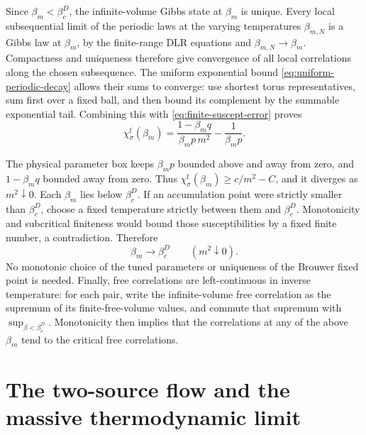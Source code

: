 \documentclass[11pt]{article}
\begin{document}
Since \(\beta_m<\beta_c^D\), the infinite-volume Gibbs state at
\(\beta_m\) is unique. Every local subsequential limit of the
periodic laws at the varying temperatures \(\beta_{m,N}\) is a
Gibbs law at \(\beta_m\), by the finite-range DLR equations and
\(\beta_{m,N}\to\beta_m\). Compactness and uniqueness therefore
give convergence of all local correlations along the chosen
subsequence. The uniform exponential bound
\eqref{eq:uniform-periodic-decay} allows their sums to converge:
use shortest torus representatives, sum first over a fixed ball,
and then bound its complement by the summable exponential tail.
Combining this with \eqref{eq:finite-suscept-error} proves
\begin{equation}\label{eq:physical_suscept}
 \chi_\sigma^{\mathrm f}(\beta_m)
   =\frac{1-\beta_m q}{\beta_m p\,m^2}
        -\frac1{\beta_m p}.
\end{equation}

The physical parameter box keeps \(\beta_m p\) bounded above
and away from zero, and \(1-\beta_mq\) bounded away from zero.
Thus \(\chi_\sigma^{\mathrm f}(\beta_m)\ge c/m^2-C\), and
it diverges as \(m^2\downarrow0\). Each \(\beta_m\) lies below
\(\beta_c^D\). If an accumulation point were strictly smaller
than \(\beta_c^D\), choose a fixed temperature strictly between
them and \(\beta_c^D\). Monotonicity and subcritical finiteness
would bound those susceptibilities by a fixed finite number,
a contradiction. Therefore
\begin{equation}\label{eq:tuned-critical-endpoint}
 \beta_m\longrightarrow\beta_c^D\qquad(m^2\downarrow0).
\end{equation}
No monotonic choice of the tuned parameters or uniqueness of the
Brouwer fixed point is needed. Finally, free correlations are
left-continuous in inverse temperature: for each pair, write the
infinite-volume free correlation as the supremum of its
finite-free-volume values, and commute that supremum with
\(\sup_{\beta<\beta_c^D}\). Monotonicity then implies that the
correlations at any of the above \(\beta_m\) tend to the critical
free correlations.


\section{The two-source flow and the massive thermodynamic limit}
\end{document}
